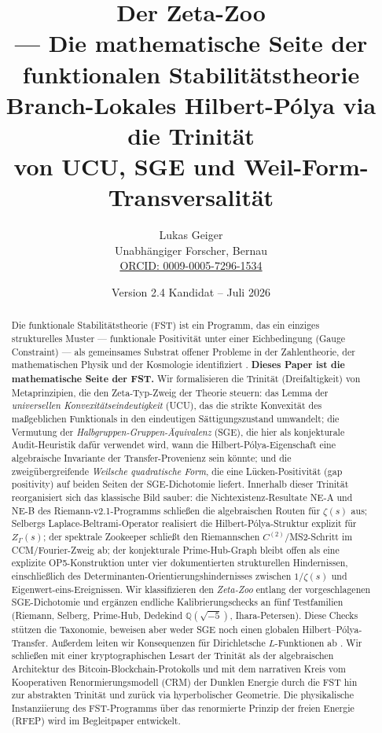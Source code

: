 \documentclass[11pt]{article}
\title{Der Zeta-Zoo\\
  \large --- Die mathematische Seite der\\
  funktionalen Stabilitätstheorie\\[0.3em]
  \normalsize Branch-Lokales Hilbert-P\'olya via die Trinität\\
  von UCU, SGE und Weil-Form-Transversalität}
\author{Lukas Geiger\\
  \small Unabhängiger Forscher, Bernau\\
  \small \href{https://orcid.org/0009-0005-7296-1534}{ORCID: 0009-0005-7296-1534}}
\date{Version 2.4 Kandidat -- Juli 2026}
\theoremstyle{definition}
\theoremstyle{remark}
\begin{document}
\maketitle

\begin{abstract}
\noindent
Die funktionale Stabilitätstheorie (FST) ist ein Programm, das ein
einziges strukturelles Muster --- funktionale Positivität unter einer
Eichbedingung (Gauge Constraint) --- als gemeinsames Substrat offener Probleme in
der Zahlentheorie, der mathematischen Physik und der Kosmologie identifiziert \cite{RFEPFramework}.
\textbf{Dieses Paper ist die mathematische Seite der FST.} Wir formalisieren
die Trinität (Dreifaltigkeit) von Metaprinzipien, die den Zeta-Typ-Zweig der
Theorie steuern: das Lemma der \emph{universellen Konvexitätseindeutigkeit} (UCU),
das die strikte Konvexität des maßgeblichen Funktionals in den
eindeutigen Sättigungszustand umwandelt; die Vermutung der
\emph{Halbgruppen-Gruppen-Äquivalenz} (SGE), die hier als konjekturale
Audit-Heuristik dafür verwendet wird, wann die Hilbert-P\'olya-Eigenschaft
eine algebraische Invariante der Transfer-Provenienz sein könnte; und die
zweigübergreifende \emph{Weilsche quadratische Form}, die eine
Lücken-Positivität (gap positivity) auf beiden Seiten der SGE-Dichotomie
liefert. Innerhalb dieser Trinität reorganisiert sich das klassische Bild
sauber: die Nichtexistenz-Resultate NE-A und NE-B des Riemann-v2.1-Programms
\cite{Geiger2026RHII} schließen die algebraischen Routen für $\zeta(s)$ aus;
Selbergs Laplace-Beltrami-Operator realisiert die Hilbert-P\'olya-Struktur
explizit für $Z_\Gamma(s)$; der spektrale Zookeeper \cite{Zookeeper2026}
schließt den Riemannschen $C^{(2)}$/MS2-Schritt im CCM/Fourier-Zweig ab; der
konjekturale Prime-Hub-Graph bleibt offen als eine explizite OP5-Konstruktion
unter vier dokumentierten strukturellen Hindernissen, einschließlich des
Determinanten-Orientierungshindernisses zwischen $1/\zeta(s)$ und
Eigenwert-eins-Ereignissen.
Wir klassifizieren den \emph{Zeta-Zoo} entlang der vorgeschlagenen
SGE-Dichotomie und ergänzen
endliche Kalibrierungschecks an fünf Testfamilien (Riemann, Selberg,
Prime-Hub, Dedekind $\mathbb{Q}(\sqrt{-5})$, Ihara-Petersen). Diese Checks
stützen die Taxonomie, beweisen aber weder SGE noch einen globalen
Hilbert--P\'olya-Transfer. Außerdem leiten wir
Konsequenzen für Dirichletsche $L$-Funktionen ab \cite{PaleyWienerDirichlet, DirichletAtlas}.
Wir schließen mit einer kryptographischen Lesart der Trinität als der algebraischen
Architektur des Bitcoin-Blockchain-Protokolls und mit dem narrativen Kreis
vom Kooperativen Renormierungsmodell (CRM) der Dunklen Energie durch die FST
hin zur abstrakten Trinität und zurück via hyperbolischer Geometrie. Die physikalische
Instanziierung des FST-Programms über das renormierte Prinzip der freien Energie (RFEP)
wird im Begleitpaper \cite{RFEPFramework} entwickelt.
\end{abstract}
\end{document}
